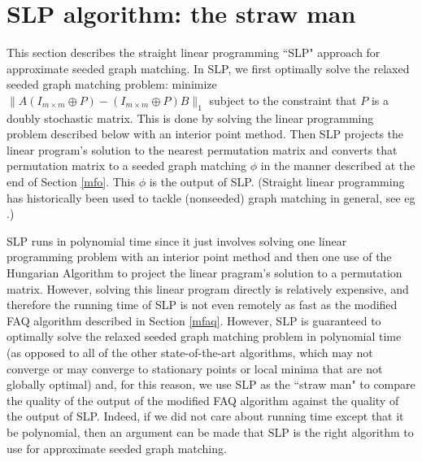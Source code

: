 \documentclass[12pt]{article}
\begin{document}
\section{SLP algorithm: the straw man \label{straw}}

This section describes the straight linear programming ``SLP" approach for
approximate seeded graph matching. In SLP, we first optimally
solve the relaxed seeded graph matching problem: minimize
$\|A(I_{m \times m}\oplus P)-(I_{m \times m}\oplus P)B\|_1$
subject to the constraint that $P$ is a doubly stochastic matrix. This is
done by solving the linear programming problem described below
with an interior point method. Then SLP projects the linear program's
solution to the nearest permutation matrix and converts that
permutation matrix to a seeded graph matching $\phi$ in the manner
described at the end of Section \ref{mfo}. This $\phi$ is the output of SLP.
(Straight linear programming has historically been used to tackle (nonseeded)
graph matching in general, see eg \cite{sixteen}.)

SLP runs in polynomial time since it just involves solving one linear
programming problem with an interior point method and then one use of the Hungarian
Algorithm to project the linear pragram's
solution to a permutation matrix. However, solving this linear program
directly is relatively expensive, and therefore the running time of SLP
is not even remotely as fast as the modified FAQ algorithm
described in Section \ref{mfaq}. However, SLP is guaranteed to
optimally solve the  relaxed seeded graph matching problem in
polynomial time (as opposed to all of the other state-of-the-art
algorithms, which may not converge or may converge to stationary points
or local minima that are not globally optimal) and, for this reason,
we use SLP as the ``straw man" to compare the quality of the
output of the modified FAQ algorithm against the quality
of the output of SLP. Indeed, if we did not care about running
time except that it be polynomial, then an argument can be made that
SLP is the right algorithm to use for approximate seeded graph matching.
\end{document}
